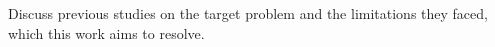 Discuss previous studies on the target problem and the limitations they faced, which this work aims to resolve.